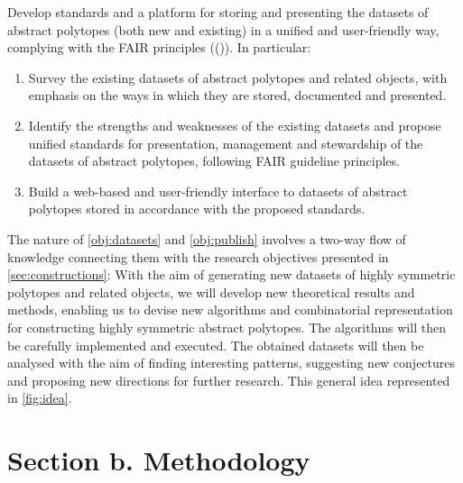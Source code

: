 \documentclass[a4paper,12pt,english]{article}
\begin{document}
\begin{obj}\label{obj:publish}
Develop standards and a platform for storing and presenting the datasets of abstract polytopes
 (both new and existing) in a unified and user-friendly way, complying with the FAIR principles ((\cite{BercKohRab2020_DeepFairMathematics,WDAAABBBSB2016_FairGuidingPrinciples})). In particular:

\begin{enumerate}[label=\textit{(\roman*)}]

\item  Survey the existing datasets of abstract polytopes and related objects, with emphasis on the ways in which they are stored, documented and presented.
\item
Identify the strengths and weaknesses of the existing datasets and propose unified standards for presentation, management and stewardship of the
datasets of abstract polytopes, following FAIR guideline principles.
\item Build a web-based and user-friendly interface to datasets of abstract polytopes stored in accordance with the proposed standards.

\end{enumerate}
\end{obj}

The nature of \cref{obj:datasets} and \cref{obj:publish} involves a two-way flow of knowledge connecting them with the research objectives presented in \cref{sec:constructions}:
With the aim of generating new datasets of highly symmetric polytopes and related objects, we will develop new theoretical results and methods, enabling us to devise new algorithms and combinatorial representation for constructing highly symmetric abstract polytopes.
The algorithms will then be carefully implemented and executed.
The obtained datasets will then be analysed with the aim of finding interesting patterns, suggesting new conjectures and proposing new directions for further research. This general idea represented in \cref{fig:idea}.


\clearpage
\section*{Section b. Methodology}





\printbibliography






 
\end{document}
